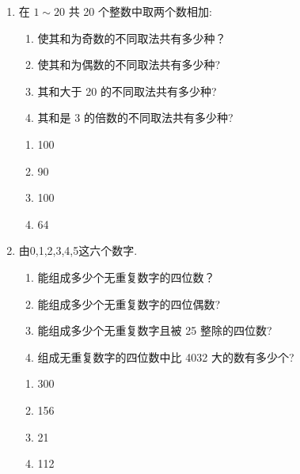 \begin{enumerate}
    \item 在 $1 \sim  {20}$ 共 20 个整数中取两个数相加:
    \begin{enumerate}
        \item 使其和为奇数的不同取法共有多少种？
        \item 使其和为偶数的不同取法共有多少种? 
        \item 其和大于 20 的不同取法共有多少种? 
        \item 其和是 3 的倍数的不同取法共有多少种?
    \end{enumerate}
    \begin{jieda}
        \begin{enumerate}
            \item 100
            \item 90
            \item 100
            \item 64
        \end{enumerate}
    \end{jieda}
    
    \item 由0,1,2,3,4,5这六个数字.
    \begin{enumerate}
        \item 能组成多少个无重复数字的四位数？
        \item 能组成多少个无重复数字的四位偶数?
        \item 能组成多少个无重复数字且被 25 整除的四位数?
        \item 组成无重复数字的四位数中比 4032 大的数有多少个?
    \end{enumerate}
    \begin{jieda}
        \begin{enumerate}
            \item 300
            \item 156
            \item 21
            \item 112
        \end{enumerate}
    \end{jieda}
\end{enumerate}

